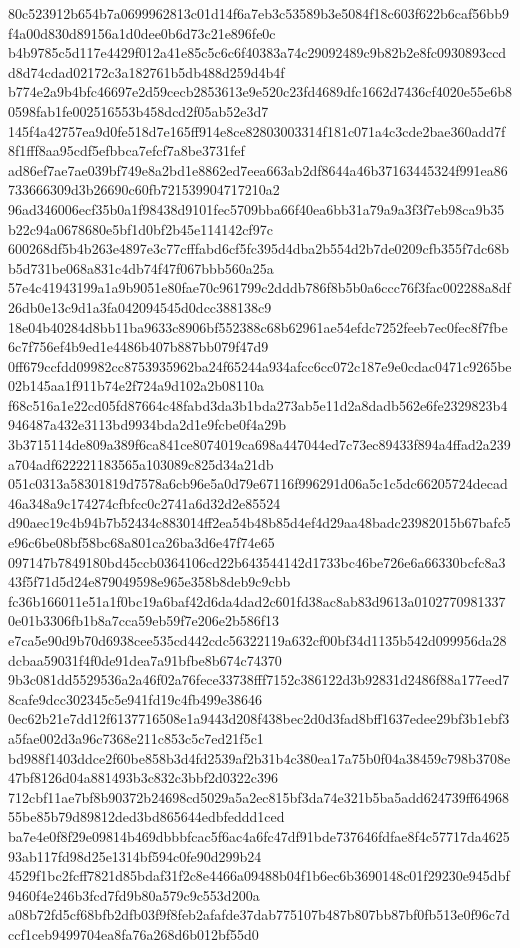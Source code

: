 \documentclass[11pt,a4paper]{article}
\begin{document}
{80c523912b654b7a0699962813c01d14f6a7eb3c53589b3e5084f18c603f622b6caf56bb9f4a00d830d89156a1d0dee0b6d73c21e896fe0c
b4b9785c5d117e4429f012a41e85c5c6c6f40383a74c29092489c9b82b2e8fc0930893ccdd8d74cdad02172c3a182761b5db488d259d4b4f
b774e2a9b4bfc46697e2d59cecb2853613e9e520c23fd4689dfc1662d7436cf4020e55e6b80598fab1fe002516553b458dcd2f05ab52e3d7
145f4a42757ea9d0fe518d7e165ff914e8ce82803003314f181c071a4c3cde2bae360add7f8f1fff8aa95cdf5efbbca7efcf7a8be3731fef
ad86ef7ae7ae039bf749e8a2bd1e8862ed7eea663ab2df8644a46b37163445324f991ea86733666309d3b26690c60fb721539904717210a2
96ad346006ecf35b0a1f98438d9101fec5709bba66f40ea6bb31a79a9a3f3f7eb98ca9b35b22c94a0678680e5bf1d0bf2b45e114142cf97c
600268df5b4b263e4897e3c77cfffabd6cf5fc395d4dba2b554d2b7de0209cfb355f7dc68bb5d731be068a831c4db74f47f067bbb560a25a
57e4c41943199a1a9b9051e80fae70c961799c2dddb786f8b5b0a6ccc76f3fac002288a8df26db0e13c9d1a3fa042094545d0dcc388138c9
18e04b40284d8bb11ba9633c8906bf552388c68b62961ae54efdc7252feeb7ec0fec8f7fbe6c7f756ef4b9ed1e4486b407b887bb079f47d9
0ff679ccfdd09982cc8753935962ba24f65244a934afcc6cc072c187e9e0cdac0471c9265be02b145aa1f911b74e2f724a9d102a2b08110a
f68c516a1e22cd05fd87664c48fabd3da3b1bda273ab5e11d2a8dadb562e6fe2329823b4946487a432e3113bd9934bda2d1e9fcbe0f4a29b
3b3715114de809a389f6ca841ce8074019ca698a447044ed7c73ec89433f894a4ffad2a239a704adf622221183565a103089c825d34a21db
051c0313a58301819d7578a6cb96e5a0d79e67116f996291d06a5c1c5dc66205724decad46a348a9c174274cfbfcc0c2741a6d32d2e85524
d90aec19c4b94b7b52434c883014ff2ea54b48b85d4ef4d29aa48badc23982015b67bafc5e96c6be08bf58bc68a801ca26ba3d6e47f74e65
097147b7849180bd45ccb0364106cd22b643544142d1733bc46be726e6a66330bcfc8a343f5f71d5d24e879049598e965e358b8deb9c9cbb
fc36b166011e51a1f0bc19a6baf42d6da4dad2c601fd38ac8ab83d9613a01027709813370e01b3306fb1b8a7cca59eb59f7e206e2b586f13
e7ca5e90d9b70d6938cee535cd442cdc56322119a632cf00bf34d1135b542d099956da28dcbaa59031f4f0de91dea7a91bfbe8b674c74370
9b3c081dd5529536a2a46f02a76fece33738fff7152c386122d3b92831d2486f88a177eed78cafe9dcc302345c5e941fd19c4fb499e38646
0ec62b21e7dd12f6137716508e1a9443d208f438bec2d0d3fad8bff1637edee29bf3b1ebf3a5fae002d3a96c7368e211c853c5c7ed21f5c1
bd988f1403ddce2f60be858b3d4fd2539af2b31b4c380ea17a75b0f04a38459c798b3708e47bf8126d04a881493b3c832c3bbf2d0322c396
712cbf11ae7bf8b90372b24698cd5029a5a2ec815bf3da74e321b5ba5add624739ff6496855be85b79d89812ded3bd865644edbfeddd1ced
ba7e4e0f8f29e09814b469dbbbfcac5f6ac4a6fc47df91bde737646fdfae8f4c57717da462593ab117fd98d25e1314bf594c0fe90d299b24
4529f1bc2fcff7821d85bdaf31f2c8e4466a09488b04f1b6ec6b3690148c01f29230e945dbf9460f4e246b3fcd7fd9b80a579c9c553d200a
a08b72fd5cf68bfb2dfb03f9f8feb2afafde37dab775107b487b807bb87bf0fb513e0f96c7dccf1ceb9499704ea8fa76a268d6b012bf55d0
}
\end{document}
